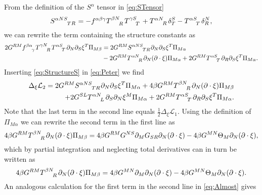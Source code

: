 From the definition of the $S^\alpha$ tensor in \eqref{eq:STensor}
\begin{equation}
    \tensor{S}{^{\alpha NS}_{TR}} = -\tensor{f}{^{\alpha\beta\gamma}}\tensor{T}{^{\beta N}_R}\tensor{T}{^{\gamma S}_T}+\tensor{T}{^{\alpha N}_R}\delta^S_T-\tensor{T}{^{\alpha S}_T}\delta^N_R,
\end{equation}
we can rewrite the term containing the structure constants as 
\begin{equation}\label{eq:StructureS}
    \begin{aligned}
        2G^{RM}\tensor{f}{^{\beta\alpha}_\gamma}\tensor{T}{^{\gamma N}_R}\tensor{T}{^{\alpha S}_T}\pd_N\pd_S\xi^T\Pi_{M\beta} &= 2G^{RM}\tensor{S}{^{\alpha NS}_{TR}}\pd_N\pd_S\xi^T\Pi_{M\alpha}\\
        &-2G^{RM}\tensor{T}{^{\alpha N}_R}\pd_N(\pd\cdot\xi)\Pi_{M\alpha}+2G^{RM}\tensor{T}{^{\alpha S}_T}\pd_R\pd_S\xi^T\Pi_{M\alpha}.
    \end{aligned}
\end{equation}
Inserting \eqref{eq:StructureS} in \eqref{eq:Peter} we find 
\begin{equation}\label{eq:Almost}
    \begin{aligned}
    \Delta_\xi \mathcal{L}_2 = 2G^{RM}\tensor{S}{^{\alpha NS}_{TR}}\pd_N\pd_S\xi^T\Pi_{M\alpha}+4\beta G^{RM}\tensor{T}{^{\beta N}_R}\pd_N(\pd\cdot\xi)\Pi_{M\beta}\\
    +2G^{SL}\tensor{T}{^{\alpha N}_L}\pd_S\pd_N\xi^M\Pi_{M\alpha}+2G^{RM}\tensor{T}{^{\alpha S}_T}\pd_R\pd_S\xi^T\Pi_{M\alpha}.
    \end{aligned}
\end{equation}
Note that the last term in the second line equals $\frac{1}{2}\Delta_\xi\mathcal{L}_1$. Using the definition of $\Pi_{M\alpha}$ we can rewrite the second term in the first line as 
\begin{equation}
    4\beta G^{RM}\tensor{T}{^{\beta N}_R}\pd_N(\pd\cdot \xi)\Pi_{M\beta} = 4\beta G^{RM}G^{NS}\pd_M G_{SR}\pd_N(\pd\cdot\xi)-4\beta G^{MN}\Theta_M\pd_N(\pd\cdot\xi),
\end{equation}
which by partial integration and neglecting total derivatives can in turn be written as 
\begin{equation}
    4\beta G^{RM}\tensor{T}{^{\beta N}_R}\pd_N(\pd\cdot \xi)\Pi_{M\beta} = 4\beta G^{MN}\pd_M\pd_N(\pd\cdot\xi)-4\beta G^{MN}\Theta_M\pd_N(\pd\cdot\xi).
\end{equation}
An analogous calculation for the first term in the second line in \eqref{eq:Almost} gives 

